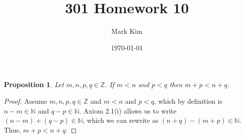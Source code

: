 \documentclass[12pt]{amsart}
\title{301 Homework 10}
\author{Mark Kim}
\date{\today}
\newcommand{\Z}{\mathbb{Z}}
\newcommand{\N}{\mathbb{N}}
\newtheorem*{proposition}{Proposition}
\begin{document}
\maketitle

\begin{proposition}
Let $m,n,p,q\in\Z$.  If $m<n$ and $p<q$ then $m+p<n+q$.
\end{proposition}

\begin{proof}
Assume $m,n,p,q\in\Z$ and $m<n$ and $p<q$, which by definition is $n-m\in\N$ and $q-p\in\N$.  Axiom 2.1(i) allows us to write $(n-m)+(q-p)\in\N$, which we can rewrite as $(n+q)-(m+p)\in\N$.  Thus, $m+p<n+q$.
\end{proof}
\end{document}
